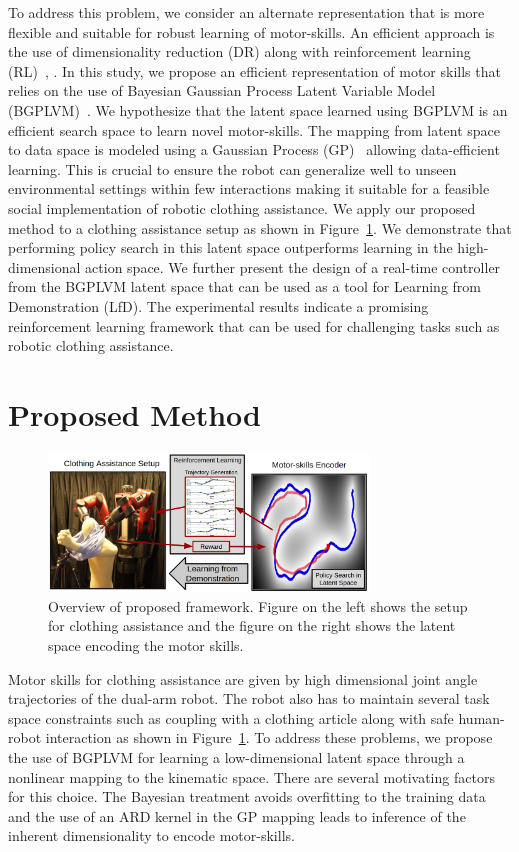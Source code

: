 \documentclass{article}
\begin{document}
To address this problem, we consider an alternate representation that is more flexible and suitable for robust learning of motor-skills. An efficient approach is the use of dimensionality reduction (DR) along with reinforcement learning (RL)~\cite{bitzer}, \cite{luck}. In this study, we propose an efficient representation of motor skills that relies on the use of Bayesian Gaussian Process Latent Variable Model (BGPLVM)~\cite{bgplvm}. We hypothesize that the latent space learned using BGPLVM is an efficient search space to learn novel motor-skills. The mapping from latent space to data space is modeled using a Gaussian Process (GP)~\cite{gp} allowing data-efficient learning. This is crucial to ensure the robot can generalize well to unseen environmental settings within few interactions making it suitable for a feasible social implementation of robotic clothing assistance. We apply our proposed method to a clothing assistance setup as shown in Figure~\ref{figure:overview}. We demonstrate that performing policy search in this latent space outperforms learning in the high-dimensional action space. We further present the design of a real-time controller from the BGPLVM latent space that can be used as a tool for Learning from Demonstration (LfD). The experimental results indicate a promising reinforcement learning framework that can be used for challenging tasks such as robotic clothing assistance.

\section{Proposed Method}
\label{section:method}

\begin{figure}
  \centering
  \includegraphics[width=0.76\textwidth, height=0.16\textheight]{overview.png}
  \caption{Overview of proposed framework. Figure on the left shows the setup for clothing assistance and the figure on the right shows the latent space encoding the motor skills.}
  \label{figure:overview}
\end{figure}
Motor skills for clothing assistance are given by high dimensional joint angle trajectories of the dual-arm robot. The robot also has to maintain several task space constraints such as coupling with a clothing article along with safe human-robot interaction as shown in Figure~\ref{figure:overview}. To address these problems, we propose the use of BGPLVM for learning a low-dimensional latent space through a nonlinear mapping to the kinematic space. There are several motivating factors for this choice. The Bayesian treatment avoids overfitting to the training data and the use of an ARD kernel in the GP mapping leads to inference of the inherent dimensionality to encode motor-skills.
\end{document}
